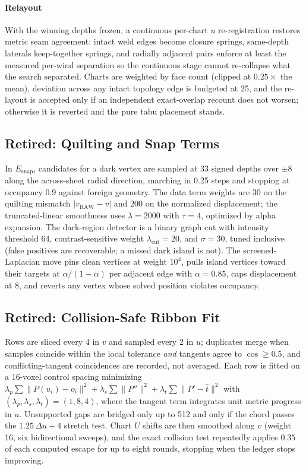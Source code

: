 \paragraph{Relayout} With the winning depths frozen, a continuous per-chart $u$ re-registration restores metric seam agreement: intact weld edges become closure springs, same-depth laterals keep-together springs, and radially adjacent pairs enforce at least the measured per-wind separation so the continuous stage cannot re-collapse what the search separated. Charts are weighted by face count (clipped at $0.25\times$ the mean), deviation across any intact topology edge is budgeted at 25, and the re-layout is accepted only if an independent exact-overlap recount does not worsen; otherwise it is reverted and the pure tabu placement stands.

\subsection{Retired: Quilting and Snap Terms}
\label{app:snap}

In $E_{\mathrm{snap}}$, candidates for a dark vertex are sampled at 33 signed depths over $\pm8$ along the across-sheet radial direction, marching in 0.25 steps and stopping at occupancy 0.9 against foreign geometry. The data term weights are $30$ on the quilting mismatch $|v_{\mathrm{RAW}} - \bar v|$ and $200$ on the normalized displacement; the truncated-linear smoothness uses $\lambda = 2000$ with $\tau = 4$, optimized by alpha expansion. The dark-region detector is a binary graph cut with intensity threshold 64, contrast-sensitive weight $\lambda_{\mathrm{cut}} = 20$, and $\sigma = 30$, tuned inclusive (false positives are recoverable; a missed dark island is not). The screened-Laplacian move pins clean vertices at weight $10^4$, pulls island vertices toward their targets at $\alpha/(1-\alpha)$ per adjacent edge with $\alpha = 0.85$, caps displacement at 8, and reverts any vertex whose solved position violates occupancy.

\subsection{Retired: Collision-Safe Ribbon Fit}
\label{app:ribbon}

Rows are sliced every 4 in $v$ and sampled every 2 in $u$; duplicates merge when samples coincide within the local tolerance {\em and} tangents agree to $\cos \ge 0.5$, and conflicting-tangent coincidences are recorded, not averaged. Each row is fitted on a 16-voxel control spacing minimizing
$\lambda_p \sum \lVert P(u_i) - o_i \rVert^2 + \lambda_s \sum \lVert P'' \rVert^2 + \lambda_t \sum \lVert P' - \hat t \rVert^2$
with $(\lambda_p, \lambda_s, \lambda_t) = (1, 8, 4)$, where the tangent term integrates unit metric progress in $u$. Unsupported gaps are bridged only up to 512 and only if the chord passes the $1.25\,\Delta u + 4$ stretch test. Chart $U$ shifts are then smoothed along $v$ (weight 16, six bidirectional sweeps), and the exact collision test repeatedly applies $0.35$ of each computed escape for up to eight rounds, stopping when the ledger stops improving.
